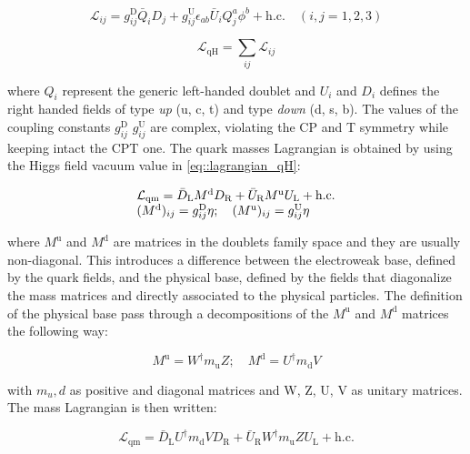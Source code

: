 \begin{equation}
\mathcal{L}_{ij} = g^{\text{D}}_{ij}\bar{Q}_{i}D_{j} + g^{\text{U}}_{ij}\epsilon_{ab}\bar{U}_{i}Q^{a}_{j}\phi^{b} + \text{h.c.} \quad (i,j = 1,2,3)
\end{equation}

\begin{equation}
\mathcal{L}_{\text{qH}} = \sum_{ij}\mathcal{L}_{ij}
\label{eq::lagrangian_qH}
\end{equation}

where $Q_{i}$ represent the generic left-handed doublet and $U_{i}$ and $D_{i}$ defines the right handed fields of type \textit{up} (u, c, t) and type \textit{down} (d, s, b). The values of the coupling constants $g^{\text{D}}_{ij}$ $g^{\text{U}}_{ij}$ are complex, violating the CP and T symmetry while keeping intact the CPT one.
The quark masses Lagrangian is obtained by using the Higgs field vacuum value in \autoref{eq::lagrangian_qH}:

\begin{equation}
\begin{array}{l c l}
\mathcal{L}_{\text{qm}} = \bar{D}_{\text{L}}M^{\text{d}}D_{\text{R}} + \bar{U}_{\text{R}}M^{\text{u}}U_{\text{L}} + \text{h.c.} \\
(M^{\text{d}})_{ij} = g^{\text{D}}_{ij}\eta; \quad (M^{\text{u}})_{ij} = g^{\text{U}}_{ij}\eta
\end{array}
\end{equation}

where $M^{\text{u}}$ and  $M^{\text{d}}$ are matrices in the doublets family space and they are usually non-diagonal. This introduces a difference between the electroweak base, defined by the quark fields, and the physical base, defined by the fields that diagonalize the mass matrices and directly associated to the physical particles.
The definition of the physical base pass through a decompositions of the $M^{\text{u}}$ and $M^{\text{d}}$ matrices the following way:

\begin{equation}
M^{\text{u}} = W^{\dagger}m_{\text{u}}Z; \quad M^{\text{d}} = U^{\dagger}m_{\text{d}}V
\end{equation}

with $m_u,d$ as positive and diagonal matrices and W, Z, U, V as unitary matrices. The mass Lagrangian is then written:

\begin{equation}
\mathcal{L}_{\text{qm}} = \bar{D}_{\text{L}}U^{\dagger}m_{\text{d}}VD_{\text{R}} + \bar{U}_{\text{R}}W^{\dagger}m_{\text{u}}ZU_{\text{L}} + \text{h.c.}
\end{equation}


